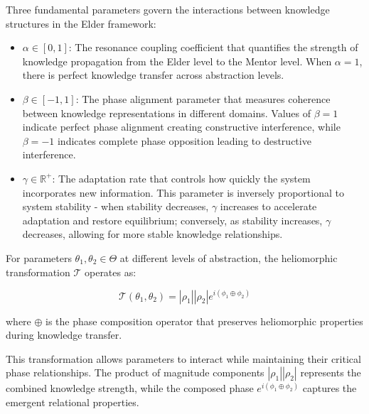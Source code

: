 \begin{definition}
Three fundamental parameters govern the interactions between knowledge structures in the Elder framework:

\begin{itemize}
    \item $\alpha \in [0,1]$: The resonance coupling coefficient that quantifies the strength of knowledge propagation from the Elder level to the Mentor level. When $\alpha = 1$, there is perfect knowledge transfer across abstraction levels.
    
    \item $\beta \in [-1,1]$: The phase alignment parameter that measures coherence between knowledge representations in different domains. Values of $\beta = 1$ indicate perfect phase alignment creating constructive interference, while $\beta = -1$ indicates complete phase opposition leading to destructive interference.
    
    \item $\gamma \in \mathbb{R}^+$: The adaptation rate that controls how quickly the system incorporates new information. This parameter is inversely proportional to system stability - when stability decreases, $\gamma$ increases to accelerate adaptation and restore equilibrium; conversely, as stability increases, $\gamma$ decreases, allowing for more stable knowledge relationships.
\end{itemize}
\end{definition}

\begin{theorem}
For parameters $\theta_1, \theta_2 \in \Theta$ at different levels of abstraction, the heliomorphic transformation $\mathcal{T}$ operates as:

\begin{equation}
\mathcal{T}(\theta_1, \theta_2) = |\rho_1||\rho_2|e^{i(\phi_1 \oplus \phi_2)}
\end{equation}

where $\oplus$ is the phase composition operator that preserves heliomorphic properties during knowledge transfer.
\end{theorem}

This transformation allows parameters to interact while maintaining their critical phase relationships. The product of magnitude components $|\rho_1||\rho_2|$ represents the combined knowledge strength, while the composed phase $e^{i(\phi_1 \oplus \phi_2)}$ captures the emergent relational properties.

